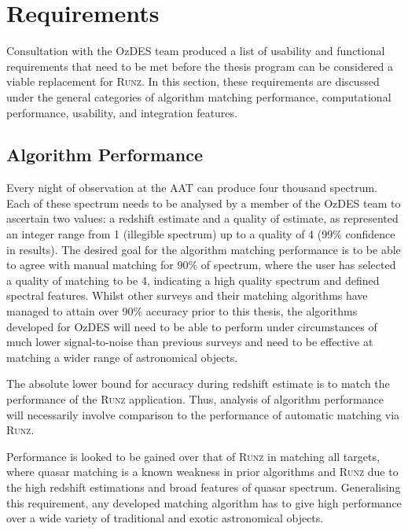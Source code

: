 \documentclass[titlesmallcaps, examinerscopy, copyrightpage]{uqthesis}
\newcommand{\runz}{\textsc{Runz}}
\begin{document}

\chapter{Requirements}
\label{ch:req}

Consultation with the OzDES team produced a list of usability and functional requirements that need to be met before the thesis program can be considered a viable replacement for \textsc{Runz}. In this section, these requirements are discussed under the general categories of algorithm matching performance, computational performance, usability, and integration features.
\section{Algorithm Performance}

Every night of observation at the AAT can produce four thousand spectrum. Each of these spectrum needs to be analysed by a member of the OzDES team to ascertain two values: a redshift estimate and a quality of estimate, as represented an integer range from 1 (illegible spectrum) up to a quality of 4 (99\% confidence in results). The desired goal for the algorithm matching performance is to be able to agree with manual matching for 90\% of spectrum, where the user has selected a quality of matching to be 4, indicating a high quality spectrum and defined spectral features. Whilst other surveys and their matching algorithms have managed to attain over 90\% accuracy prior to this thesis, the algorithms developed for OzDES will need to be able to perform under circumstances of much lower signal-to-noise than previous surveys and need to be effective at matching a wider range of astronomical objects.

The absolute lower bound for accuracy during redshift estimate is to match the performance of the \textsc{Runz} application. Thus, analysis of algorithm performance will necessarily involve comparison to the performance of automatic matching via \textsc{Runz}.

Performance is looked to be gained over that of \runz{} in matching all targets, where quasar matching is a known weakness in prior algorithms and \runz{} due to the high redshift estimations and broad features of quasar spectrum. Generalising this requirement, any developed matching algorithm has to give high performance over a wide variety of traditional and exotic astronomical objects.
\end{document}
